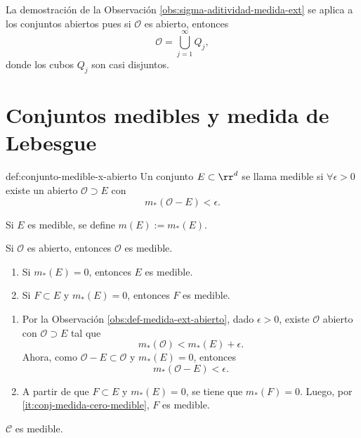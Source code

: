 La demostraci\'on de la Observaci\'on \ref{obs:sigma-aditividad-medida-ext} se aplica a los conjuntos abiertos pues si
$\mathcal{O}$ es abierto, entonces
\[
\mathcal{O}=\bigcup\limits_{j=1}^{\infty} Q_j,
\]
donde los cubos $Q_j$ son casi disjuntos.


\section{Conjuntos medibles y medida de Lebesgue}

\begin{definicion}{def:conjunto-medible-x-abierto}
Un conjunto $E\subset \rr^d$ se llama medible si $\forall \epsilon>0$ existe un abierto $\mathcal{O}\supset E$
con 
\[
m_{*}(\mathcal{O}-E)<\epsilon.
\]
\end{definicion}

Si $E$ es medible, se define $m(E):=m_{*}(E)$.

\begin{proposicion}{}
Si $\mathcal{O}$ es abierto, entonces $\mathcal{O}$ es medible.
\end{proposicion}

\begin{proposicion}{}
\begin{enumerate}
    \item\label{it:conj-medida-cero-medible} Si $m_{*}(E)=0$, entonces $E$ es medible. 
    \item Si $F\subset E$ y $m_{*}(E)=0$, entonces $F$ es medible.
\end{enumerate}
\end{proposicion}

\begin{demo}
\begin{enumerate}
    \item Por la Observaci\'on \ref{obs:def-medida-ext-abierto}, 
    dado $\epsilon>0$, existe $\mathcal{O}$ abierto con $\mathcal{O}\supset E$ tal que 
    \[
    m_{*}(\mathcal{O})<m_{*}(E)+\epsilon.
    \]
    Ahora, como $\mathcal{O}-E \subset \mathcal{O}$ y $m_{*}(E)=0$, entonces 
    \[
    m_{*}(\mathcal{O}-E)<\epsilon.
    \]

\item  A partir de que $F\subset E$ y $m_{*}(E)=0$, se tiene que $m_{*}(F)=0$. 
Luego, por \ref{it:conj-medida-cero-medible}, $F$ es medible.
\end{enumerate}
\end{demo}

\begin{observacion}{}
$\mathscr{C}$ es medible.
\end{observacion}


